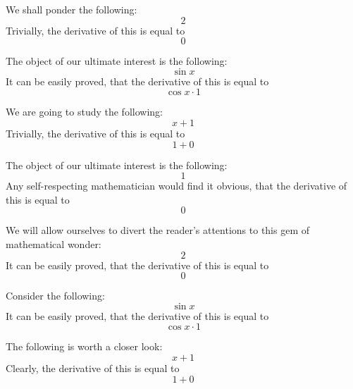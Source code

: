 \documentclass{article}
\begin{document}
We shall ponder the following:
\begin{equation}
2 
\end{equation}
Trivially, the derivative of this is equal to
\begin{equation}
0 
\end{equation}

The object of our ultimate interest is the following:
\begin{equation}
\sin x 
\end{equation}
It can be easily proved, that the derivative of this is equal to
\begin{equation}
\cos x \cdot 1 
\end{equation}

We are going to study the following:
\begin{equation}
x + 1 
\end{equation}
Trivially, the derivative of this is equal to
\begin{equation}
1 + 0 
\end{equation}

The object of our ultimate interest is the following:
\begin{equation}
1 
\end{equation}
Any self-respecting mathematician would find it obvious, that the derivative of this is equal to
\begin{equation}
0 
\end{equation}

We will allow ourselves to divert the reader's attentions to this gem of mathematical wonder:
\begin{equation}
2 
\end{equation}
It can be easily proved, that the derivative of this is equal to
\begin{equation}
0 
\end{equation}

Consider the following:
\begin{equation}
\sin x 
\end{equation}
It can be easily proved, that the derivative of this is equal to
\begin{equation}
\cos x \cdot 1 
\end{equation}

The following is worth a closer look:
\begin{equation}
x + 1 
\end{equation}
Clearly, the derivative of this is equal to
\begin{equation}
1 + 0 
\end{equation}
\end{document}
